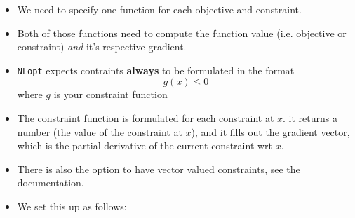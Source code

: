 \documentclass[11pt]{article}
\providecommand{\tightlist}{%
      \setlength{\itemsep}{0pt}\setlength{\parskip}{0pt}}
\begin{document}
\begin{itemize}
\tightlist
\item
  We need to specify one function for each objective and constraint.
\item
  Both of those functions need to compute the function value (i.e.
  objective or constraint) \emph{and} it's respective gradient.
\item
  \texttt{NLopt} expects contraints \textbf{always} to be formulated in
  the format \[ g(x) \leq 0 \] where \(g\) is your constraint function
\item
  The constraint function is formulated for each constraint at \(x\). it
  returns a number (the value of the constraint at \(x\)), and it fills
  out the gradient vector, which is the partial derivative of the
  current constraint wrt \(x\).
\item
  There is also the option to have vector valued constraints, see the
  documentation.
\item
  We set this up as follows:
\end{itemize}
\end{document}
